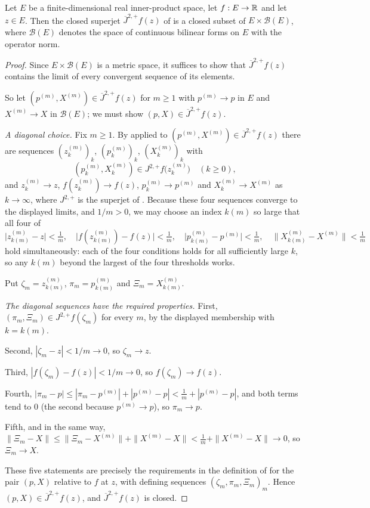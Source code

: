 \begin{lemma}
Let $E$ be a finite-dimensional real inner-product space, let $f:E\to\mathbb{R}$ and let
$z\in E$. Then the closed superjet $\overline J^{2,+}f(z)$ of
 is a closed subset of $E\times\mathcal B(E)$, where
$\mathcal B(E)$ denotes the space of continuous bilinear forms on $E$ with the
operator norm.
\end{lemma}
\begin{proof}
Since $E\times\mathcal B(E)$ is a metric space, it suffices to show that
$\overline J^{2,+}f(z)$ contains the limit of every convergent sequence of its
elements.

So let $(p^{(m)},X^{(m)})\in\overline J^{2,+}f(z)$ for $m\ge1$ with
$p^{(m)}\to p$ in $E$ and $X^{(m)}\to X$ in $\mathcal B(E)$; we must show
$(p,X)\in\overline J^{2,+}f(z)$.

\emph{A diagonal choice.}
Fix $m\ge1$. By  applied to
$(p^{(m)},X^{(m)})\in\overline J^{2,+}f(z)$ there are sequences
$(z^{(m)}_k)_k$, $(p^{(m)}_k)_k$, $(X^{(m)}_k)_k$ with
\[
  (p^{(m)}_k,X^{(m)}_k)\in J^{2,+}f\bigl(z^{(m)}_k\bigr)\quad(k\ge0),
\]
and $z^{(m)}_k\to z$, $f(z^{(m)}_k)\to f(z)$, $p^{(m)}_k\to p^{(m)}$ and
$X^{(m)}_k\to X^{(m)}$ as $k\to\infty$, where $J^{2,+}$ is the superjet of
. Because these four sequences converge to the displayed
limits, and $1/m>0$, we may choose an index $k(m)$ so large that all four of
\[
  \bigl|z^{(m)}_{k(m)}-z\bigr|<\tfrac1m,\quad
  \bigl|f(z^{(m)}_{k(m)})-f(z)\bigr|<\tfrac1m,\quad
  \bigl|p^{(m)}_{k(m)}-p^{(m)}\bigr|<\tfrac1m,\quad
  \bigl\|X^{(m)}_{k(m)}-X^{(m)}\bigr\|<\tfrac1m
\]
hold simultaneously: each of the four conditions holds for all sufficiently
large $k$, so any $k(m)$ beyond the largest of the four thresholds works.

Put $\zeta_m=z^{(m)}_{k(m)}$, $\pi_m=p^{(m)}_{k(m)}$ and
$\Xi_m=X^{(m)}_{k(m)}$.

\emph{The diagonal sequences have the required properties.}
First, $(\pi_m,\Xi_m)\in J^{2,+}f(\zeta_m)$ for every $m$, by the displayed
membership with $k=k(m)$.

Second, $|\zeta_m-z|<1/m\to0$, so $\zeta_m\to z$.

Third, $|f(\zeta_m)-f(z)|<1/m\to0$, so $f(\zeta_m)\to f(z)$.

Fourth, $|\pi_m-p|\le|\pi_m-p^{(m)}|+|p^{(m)}-p|<\tfrac1m+|p^{(m)}-p|$, and both
terms tend to $0$ (the second because $p^{(m)}\to p$), so $\pi_m\to p$.

Fifth, and in the same way,
$\|\Xi_m-X\|\le\|\Xi_m-X^{(m)}\|+\|X^{(m)}-X\|<\tfrac1m+\|X^{(m)}-X\|\to0$, so
$\Xi_m\to X$.

These five statements are precisely the requirements in the definition of
 for the pair $(p,X)$ relative to $f$ at $z$, with
defining sequences $(\zeta_m,\pi_m,\Xi_m)_m$. Hence
$(p,X)\in\overline J^{2,+}f(z)$, and $\overline J^{2,+}f(z)$ is closed.
\end{proof}
